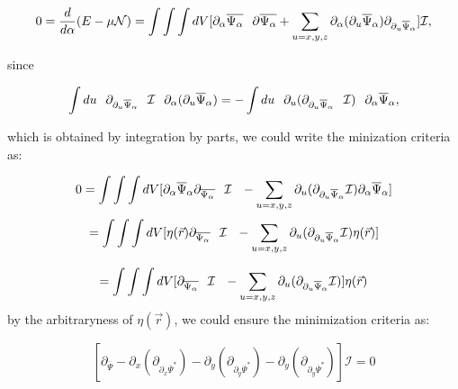 \documentclass[12pt]{article}
\begin{document}
\begin{flushleft}
\[
0 = \frac{d}{d\alpha} (E - \mu \mathcal{N}) = \int \int \int dV [\partial_{\alpha}\overline{\Psi_{\alpha}} \hspace{0.25cm}\partial\overline{\Psi_{\alpha}} + \sum_{u = x,y,z} \partial_{\alpha}(\partial_{u} \overline\Psi_{\alpha})\partial_{\partial_{u}\overline{\Psi}_{\alpha}}]\mathbf{\mathcal{I}},
\]

since

\[
\int du \hspace{0.25cm} \partial_{\partial_{u}\overline{\Psi}_{\alpha}} \hspace{0.25cm} \mathbf{\mathcal{I}} \hspace{0.25cm} \partial_{
\alpha}(\partial_{u} \overline{\Psi}_{\alpha}) = - \int du \hspace{0.25cm} \partial_{u}(\partial_{\partial_{u}\overline{\Psi}_{\alpha}} \hspace{0.25cm} \mathbf{\mathcal{I}}) \hspace{0.25cm} \partial_{\alpha} \overline{\Psi}_{\alpha},
\]

which is obtained by integration by parts, we could write the minization criteria as:

\[
0 = \int \int \int dV [\partial_{\alpha} \overline{\Psi}_{\alpha} \partial_{\overline{\Psi_{\alpha}}} \hspace{0.25cm} \mathbf{\mathcal{I}} \hspace{0.25cm} - \sum_{u = x,y,z} \partial_{u} (\partial_{\partial_{u}\overline{\Psi}_{\alpha}}\mathbf{\mathcal{I}})\partial_{\alpha}\overline{\Psi}_{\alpha}]
\]
\[ = 
\int \int \int dV [\eta(\vec{r})\partial_{\overline{\Psi_{\alpha}}} \hspace{0.25cm} \mathbf{\mathcal{I}} \hspace{0.25cm} - \sum_{u = x,y,z} \partial_{u} (\partial_{\partial_{u}\overline{\Psi}_{\alpha}}\mathbf{\mathcal{I}})\eta({\vec{r}})]
\]

\[ = 
\int \int \int dV [\partial_{\overline{\Psi_{\alpha}}} \hspace{0.25cm} \mathbf{\mathcal{I}} \hspace{0.25cm} - \sum_{u = x,y,z} \partial_{u} (\partial_{\partial_{u}\overline{\Psi}_{\alpha}}\mathbf{\mathcal{I}})] \eta(\vec{r})
\]
by the arbitraryness of $\eta(\vec{r})$, we could ensure the minimization criteria as:

\[
[\partial_{\overline{\Psi}} - \partial_{x} (\partial_{\partial_{x}\overline{\Psi}^{*}})  - \partial_{y} (\partial_{\partial_{y}\overline{\Psi}^{*}})  - \partial_{y} (\partial_{\partial_{y}\overline{\Psi}^{*}})]\mathbf{\mathcal{I}} = 0
\]


\end{flushleft}
\end{document}
